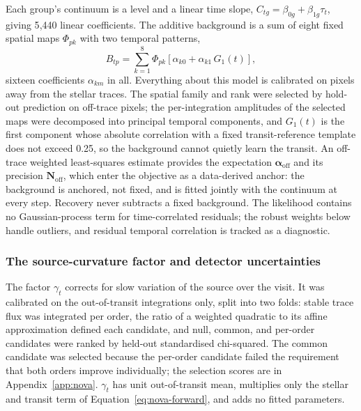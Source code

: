 Each group's continuum is a level and a linear time slope,
$C_{tg}=\beta_{0g}+\beta_{1g}\tau_t$, giving 5{,}440 linear coefficients.
The additive background is a sum of eight fixed spatial maps $\Phi_{pk}$
with two temporal patterns,
\begin{equation}
 B_{tp}=\sum_{k=1}^{8}\Phi_{pk}
 \left[\alpha_{k0}+\alpha_{k1}\,G_1(t)\right],
 \label{eq:background-model}
\end{equation}
sixteen coefficients $\alpha_{km}$ in all. Everything about this model is
calibrated on pixels away from the stellar traces. The spatial family and
rank were selected by hold-out prediction on off-trace pixels; the
per-integration amplitudes of the selected maps were decomposed into
principal temporal components, and $G_1(t)$ is the first component whose
absolute correlation with a fixed transit-reference template does not
exceed 0.25, so the background cannot quietly learn the transit. An
off-trace weighted least-squares estimate provides the expectation
$\bm{\alpha}_{\mathrm{off}}$ and its precision $\bm{N}_{\mathrm{off}}$,
which enter the objective as a data-derived anchor: the background is
anchored, not fixed, and is fitted jointly with the continuum at every
step. Recovery never subtracts a fixed background. The likelihood contains
no Gaussian-process term for time-correlated residuals; the robust weights
below handle outliers, and residual temporal correlation is tracked as a
diagnostic.

\subsubsection{The source-curvature factor and detector uncertainties}


The factor $\gamma_t$ corrects for slow variation of the source over the
visit. It was calibrated on the out-of-transit integrations only, split
into two folds: stable trace flux was integrated per order, the ratio of a
weighted quadratic to its affine approximation defined each candidate, and
null, common, and per-order candidates were ranked by held-out
standardised chi-squared. The common candidate was selected because the
per-order candidate failed the requirement that both orders improve
individually; the selection scores are in Appendix~\ref{app:nova}.
$\gamma_t$ has unit out-of-transit mean, multiplies only the stellar and
transit term of Equation~\ref{eq:nova-forward}, and adds no fitted
parameters.

